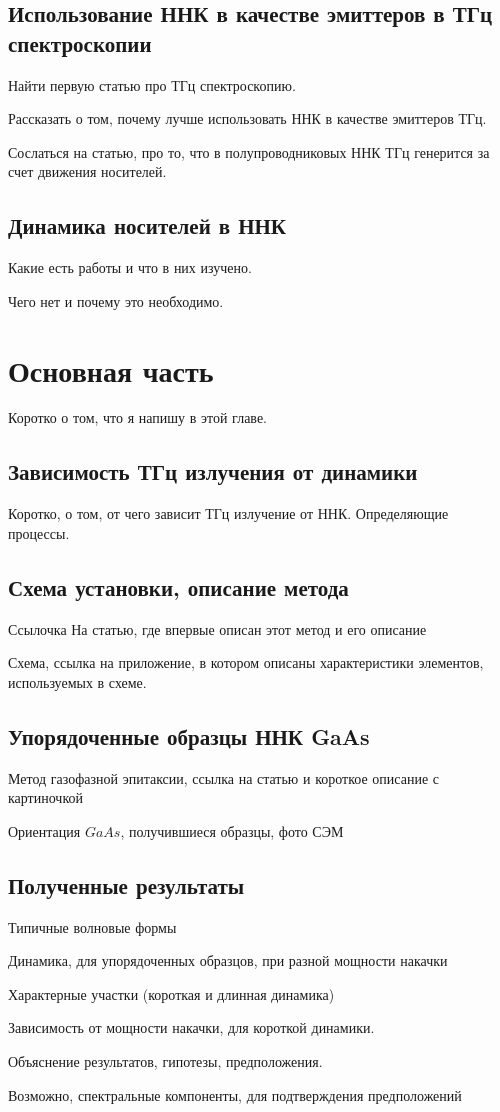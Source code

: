 \documentclass[a4paper,14pt,russian]{extreport}
\begin{document}
		\section{Использование ННК в качестве эмиттеров в ТГц спектроскопии}
			Найти первую статью про ТГц спектроскопию.\par
			Рассказать о том, почему лучше использовать ННК в качестве эмиттеров ТГц.\par
			Сослаться на статью, про то, что в полупроводниковых ННК ТГц генерится за счет движения носителей.
		\section{Динамика носителей в ННК}
			Какие есть работы и что в них изучено.\par
			Чего нет и почему это необходимо.
	\chapter{Основная часть}
			Коротко о том, что я напишу в этой главе.
		\section{Зависимость ТГц излучения от динамики}
			Коротко, о том, от чего зависит ТГц излучение от ННК. Определяющие процессы.	
		\section{Схема установки, описание метода}
			Ссылочка На статью, где впервые описан этот метод и его описание\par	
			Схема, ссылка на приложение, в котором описаны характеристики элементов, используемых в схеме.\par
		\section{Упорядоченные образцы ННК GaAs}
			Метод газофазной эпитаксии, ссылка на статью и короткое описание с картиночкой\par
			Ориентация $GaAs$, получившиеся образцы, фото СЭМ
		\section{Полученные результаты}
			Типичные волновые формы\par
			Динамика, для упорядоченных образцов, при разной мощности накачки\par
			Характерные участки (короткая и длинная динамика) \par
			Зависимость от мощности накачки, для короткой динамики.\par
			Объяснение результатов, гипотезы, предположения.\par
			Возможно, спектральные компоненты, для подтверждения предположений
\end{document}
